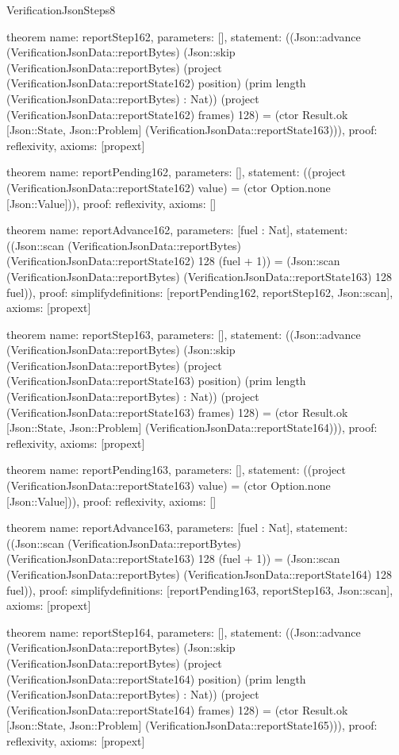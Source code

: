 \begin{lexlean}{VerificationJsonSteps8}
\begin{semanticmodule}
theorem{
  name: reportStep162,
  parameters: [],
  statement: ((Json::advance (VerificationJsonData::reportBytes) (Json::skip (VerificationJsonData::reportBytes) (project (VerificationJsonData::reportState162) position) (prim length (VerificationJsonData::reportBytes) : Nat)) (project (VerificationJsonData::reportState162) frames) 128) = (ctor Result.ok [Json::State, Json::Problem] (VerificationJsonData::reportState163))),
  proof: reflexivity{},
  axioms: [propext]
}

theorem{
  name: reportPending162,
  parameters: [],
  statement: ((project (VerificationJsonData::reportState162) value) = (ctor Option.none [Json::Value])),
  proof: reflexivity{},
  axioms: []
}

theorem{
  name: reportAdvance162,
  parameters: [fuel : Nat],
  statement: ((Json::scan (VerificationJsonData::reportBytes) (VerificationJsonData::reportState162) 128 (fuel + 1)) = (Json::scan (VerificationJsonData::reportBytes) (VerificationJsonData::reportState163) 128 fuel)),
  proof: simplify{definitions: [reportPending162, reportStep162, Json::scan]},
  axioms: [propext]
}

theorem{
  name: reportStep163,
  parameters: [],
  statement: ((Json::advance (VerificationJsonData::reportBytes) (Json::skip (VerificationJsonData::reportBytes) (project (VerificationJsonData::reportState163) position) (prim length (VerificationJsonData::reportBytes) : Nat)) (project (VerificationJsonData::reportState163) frames) 128) = (ctor Result.ok [Json::State, Json::Problem] (VerificationJsonData::reportState164))),
  proof: reflexivity{},
  axioms: [propext]
}

theorem{
  name: reportPending163,
  parameters: [],
  statement: ((project (VerificationJsonData::reportState163) value) = (ctor Option.none [Json::Value])),
  proof: reflexivity{},
  axioms: []
}

theorem{
  name: reportAdvance163,
  parameters: [fuel : Nat],
  statement: ((Json::scan (VerificationJsonData::reportBytes) (VerificationJsonData::reportState163) 128 (fuel + 1)) = (Json::scan (VerificationJsonData::reportBytes) (VerificationJsonData::reportState164) 128 fuel)),
  proof: simplify{definitions: [reportPending163, reportStep163, Json::scan]},
  axioms: [propext]
}

theorem{
  name: reportStep164,
  parameters: [],
  statement: ((Json::advance (VerificationJsonData::reportBytes) (Json::skip (VerificationJsonData::reportBytes) (project (VerificationJsonData::reportState164) position) (prim length (VerificationJsonData::reportBytes) : Nat)) (project (VerificationJsonData::reportState164) frames) 128) = (ctor Result.ok [Json::State, Json::Problem] (VerificationJsonData::reportState165))),
  proof: reflexivity{},
  axioms: [propext]
}


\end{semanticmodule}
\end{lexlean}
